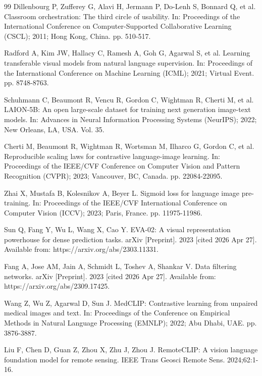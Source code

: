 \documentclass[10pt,letterpaper]{article}
\begin{document}
\begin{thebibliography}{99}
Dillenbourg P, Zufferey G, Alavi H, Jermann P, Do-Lenh S, Bonnard Q,
et al.
Classroom orchestration: The third circle of usability.
In: Proceedings of the International Conference on
Computer-Supported Collaborative Learning (CSCL); 2011; Hong Kong,
China. pp. 510-517.

Radford A, Kim JW, Hallacy C, Ramesh A, Goh G, Agarwal S, et al.
Learning transferable visual models from natural language supervision.
In: Proceedings of the International Conference on Machine Learning
(ICML); 2021; Virtual Event. pp. 8748-8763.

Schuhmann C, Beaumont R, Vencu R, Gordon C, Wightman R, Cherti M,
et al. LAION-5B: An open large-scale dataset for training next
generation image-text models. In: Advances in Neural Information
Processing Systems (NeurIPS); 2022; New Orleans, LA, USA. Vol. 35.

Cherti M, Beaumont R, Wightman R, Wortsman M, Ilharco G, Gordon C,
et al.
Reproducible scaling laws for contrastive language-image learning.
In: Proceedings of the IEEE/CVF Conference on Computer Vision and
Pattern Recognition (CVPR); 2023; Vancouver, BC, Canada.
pp. 22084-22095.

Zhai X, Mustafa B, Kolesnikov A, Beyer L.
Sigmoid loss for language image pre-training.
In: Proceedings of the IEEE/CVF International Conference on Computer
Vision (ICCV); 2023; Paris, France. pp. 11975-11986.

Sun Q, Fang Y, Wu L, Wang X, Cao Y.
EVA-02: A visual representation powerhouse for dense prediction tasks.
arXiv [Preprint]. 2023 [cited 2026 Apr 27]. Available from:
https://arxiv.org/abs/2303.11331.

Fang A, Jose AM, Jain A, Schmidt L, Toshev A, Shankar V.
Data filtering networks.
arXiv [Preprint]. 2023 [cited 2026 Apr 27]. Available from:
https://arxiv.org/abs/2309.17425.

Wang Z, Wu Z, Agarwal D, Sun J.
MedCLIP: Contrastive learning from unpaired medical images and text.
In: Proceedings of the Conference on Empirical Methods in Natural
Language Processing (EMNLP); 2022; Abu Dhabi, UAE. pp. 3876-3887.

Liu F, Chen D, Guan Z, Zhou X, Zhu J, Zhou J.
RemoteCLIP: A vision language foundation model for remote sensing.
IEEE Trans Geosci Remote Sens. 2024;62:1-16.


\end{thebibliography}
\end{document}
